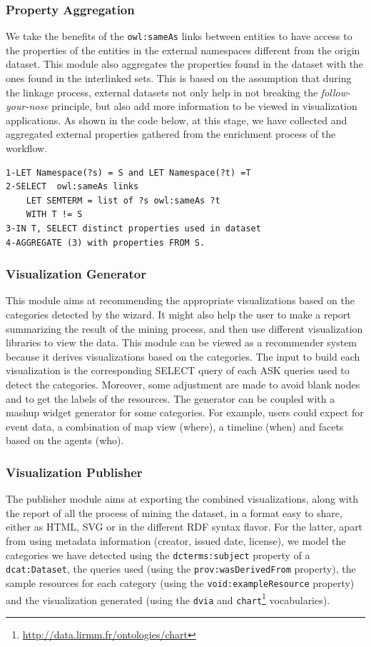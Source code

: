 \subsubsection{Property Aggregation}
We take the benefits of the \texttt{owl:sameAs} links between entities to have access to the properties of the entities in the external namespaces different from the origin dataset. This module also aggregates the properties found in the dataset with the ones found in the interlinked sets. This is based on the assumption that during the linkage process, external datasets not only help in not breaking the \textit{follow-your-nose} principle, but also add more information to be viewed in visualization applications. As shown in the code below, at this stage, we have collected and aggregated external properties gathered from the enrichment process of the workflow.

\begin{verbatim}
1-LET Namespace(?s) = S and LET Namespace(?t) =T
2-SELECT  owl:sameAs links
	LET SEMTERM = list of ?s owl:sameAs ?t
	WITH T != S
3-IN T, SELECT distinct properties used in dataset
4-AGGREGATE (3) with properties FROM S.
\end{verbatim}

\subsubsection{Visualization Generator}
This module aims at recommending the appropriate visualizations based on the categories detected by the wizard. It might also help the user to make a report summarizing the result of the mining process, and then use different visualization libraries to view the data. This module can be viewed as a recommender system because it derives visualizations based on the categories. The input to build each visualization is the corresponding SELECT query of each ASK queries used to detect the categories. Moreover, some adjustment are made to avoid blank nodes and to get the labels of the resources. The generator can be coupled with a mashup widget generator for some  categories. For example, users could expect for event data, a combination of map view (where), a timeline (when) and facets based on the agents (who).

\subsubsection{Visualization Publisher}
The publisher module aims at exporting the combined visualizations, along with the report of all the process of mining the dataset, in a format easy to share, either as HTML, SVG or in the different RDF syntax flavor. For the latter, apart from using metadata information (creator, issued date, license), we model the categories we have detected using the \texttt{dcterms:subject} property of a \texttt{dcat:Dataset}, the queries used (using the \texttt{prov:wasDerivedFrom} property), the sample resources for each category (using the \texttt{void:exampleResource} property) and the visualization generated (using the \texttt{dvia} and \texttt{chart}\footnote{\url{http://data.lirmm.fr/ontologies/chart}} vocabularies).

